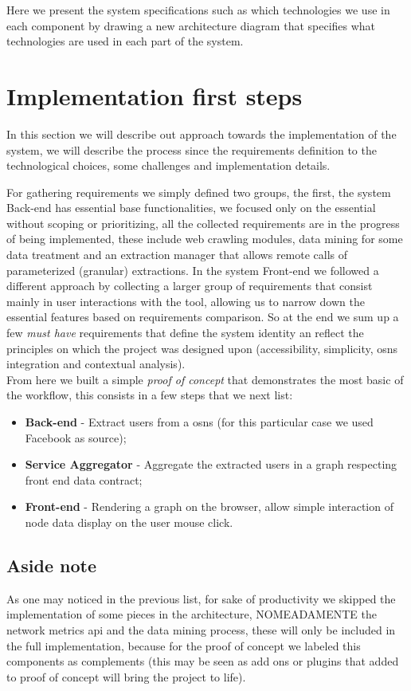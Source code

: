 Here we present the system specifications such as which technologies we use in each component by drawing a new architecture diagram that specifies what technologies are used in each part of the system.

\section{Implementation first steps}
In this section we will describe out approach towards the implementation of the system, we will describe the process since the requirements
definition to the technological choices, some challenges and implementation details.

For gathering requirements we simply defined two groups, the first, the system Back-end has essential base functionalities, we focused only
on the essential without scoping or prioritizing, all the collected requirements are in the progress of being implemented, these include
web crawling modules, data mining for some data treatment and an extraction manager that allows remote calls of parameterized (granular) extractions.
In the system Front-end we followed a different approach by collecting a larger group of requirements that consist mainly in user interactions with the tool,
allowing us to narrow down the essential features based on requirements comparison. So at the end we sum up a few \textit{must have} requirements that
define the system identity an reflect the principles on which the project was designed upon (accessibility, simplicity, \glspl{osn} integration and contextual analysis).\\

\indent From here we built a simple \textit{proof of concept} that demonstrates the most basic of the workflow, this consists in a few steps that we next list:
\begin{itemize}
    \item \textbf{Back-end} - Extract users from a \glspl{osn} (for this particular case we used Facebook as source);
    \item \textbf{Service Aggregator} - Aggregate the extracted users in a graph respecting front end data contract;
    \item \textbf{Front-end} - Rendering a graph on the browser, allow simple interaction of node data display on the user mouse click.
\end{itemize}

\subsection*{Aside note}
As one may noticed in the previous list, for sake of productivity we skipped the implementation of some pieces in the architecture,
NOMEADAMENTE the network metrics api and the data mining process, these will only be included in the full implementation, because for the proof
of concept we labeled this components as complements (this may be seen as add ons or plugins that added to proof of concept will bring the
project to life).

